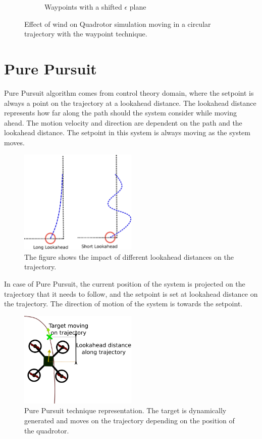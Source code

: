 \documentclass[hidelinks,BTech]{iitmdiss}
\begin{document}
\begin{figure}[H]
\begin{subfigure}[t]{0.49\textwidth}
      \caption{Waypoints with a shifted $\epsilon$ plane}
  \end{subfigure}
  \caption{Effect of wind on Quadrotor simulation moving in a circular trajectory with the waypoint technique.}
\end{figure}


\section{ Pure Pursuit}
Pure Pursuit algorithm comes from control theory domain, where the setpoint is always a point on the trajectory at a lookahead distance. The lookahead distance represents how far along the path should the system consider while moving ahead. The motion velocity and direction are dependent on the path and the lookahead distance. The setpoint in this system is always moving as the system moves.

\begin{figure}[H]
  \centering
    \includegraphics[width=0.5\textwidth]{Pure_Pursuit_path.png}
    \caption{The figure shows the impact of different lookahead distances on the trajectory.}
\end{figure}

In case of Pure Pursuit, the current position of the system is projected on the trajectory that it needs to follow, and the setpoint is set at lookahead distance on the trajectory. The direction of motion of the system is towards the setpoint. 

\begin{figure}[H]
  \centering
    \includegraphics[width=0.5\textwidth]{Pure_Pursuit.png}
    \caption{Pure Pursuit technique representation. The target is dynamically generated and moves on the trajectory depending on the position of the quadrotor.}
\end{figure}
\end{document}
